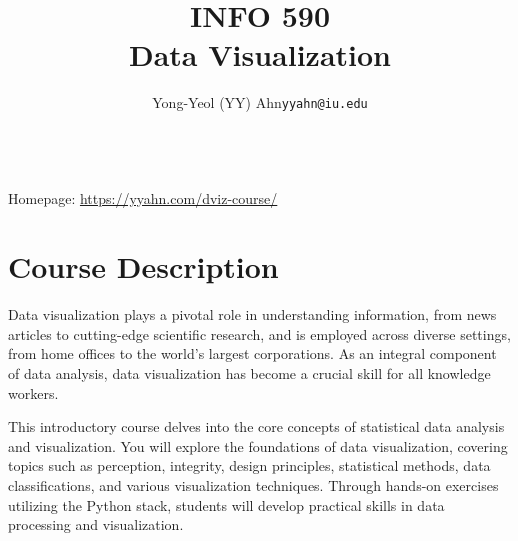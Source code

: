 \documentclass[11pt,article,oneside]{memoir} %
\makeatletter
\def\myauthor{Author}
\def\mytitle{Title}
\def\myaddress{\url{https://iu.zoom.us/my/yyahn}}
\def\myemail{yyahn@iu.edu}
\def\myauthor{Yong-Yeol (YY) Ahn}
\def\mytitle{{\normalsize INFO 590} \\ \HUGE{} Data Visualization}
\makeatother
\begin{document}

\title{\LARGE \mytitle} %
\author{\Large\myauthor\newline \footnotesize\texttt{\noindent\myemail}}


\maketitle 

\vspace{-20pt}{Office hours \& TAs: see Canvas} \\
{Homepage: \url{https://yyahn.com/dviz-course/}}


\section{Course Description}%

Data visualization plays a pivotal role in understanding information, from news
articles to cutting-edge scientific research, and is employed across diverse
settings, from home offices to the world's largest corporations. As an integral
component of data analysis, data visualization has become a crucial skill for
all knowledge workers.

This introductory course delves into the core concepts of statistical data
analysis and visualization. You will explore the foundations of data
visualization, covering topics such as perception, integrity, design principles,
statistical methods, data classifications, and various visualization techniques.
Through hands-on exercises utilizing the Python stack, students will develop
practical skills in data processing and visualization.
\end{document}
